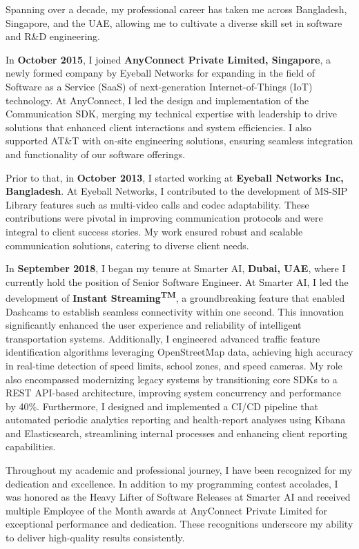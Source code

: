 \documentclass[11pt]{article}
\begin{document}
Spanning over a decade, my professional career has taken me across Bangladesh, Singapore, and the UAE,
allowing me to cultivate a diverse skill set in software and R\&D engineering.

In \textbf{October 2015}, I joined \textbf{AnyConnect Private Limited, Singapore}, a newly formed company by Eyeball
Networks for expanding in the field of Software as a Service (SaaS) of next-generation Internet-of-Things
(IoT) technology. At AnyConnect, I led the design and implementation of the Communication SDK,
merging my technical expertise with leadership to drive solutions that enhanced client interactions and
system efficiencies. I also supported AT\&T with on-site engineering solutions, ensuring seamless integration and
functionality of our software offerings.

Prior to that, in \textbf{October 2013}, I started working at \textbf{Eyeball Networks Inc, Bangladesh}. At
Eyeball Networks, I contributed to the development of MS-SIP Library features such as multi-video calls and
codec adaptability. These contributions were pivotal in improving communication protocols and were integral
to client success stories. My work ensured robust and scalable communication solutions, catering to diverse
client needs.

In \textbf{September 2018}, I began my tenure at Smarter AI, \textbf{Dubai, UAE}, where I currently hold the position
of Senior Software Engineer. At Smarter AI, I led the development of \textbf{Instant Streaming\textsuperscript{TM}},
a groundbreaking feature that enabled Dashcams to establish seamless connectivity within one second. This
innovation significantly enhanced the user experience and reliability of intelligent transportation systems.
Additionally, I engineered advanced traffic feature identification algorithms leveraging OpenStreetMap data,
achieving high accuracy in real-time detection of speed limits, school zones, and speed cameras. My role also
encompassed modernizing legacy systems by transitioning core SDKs to a REST API-based architecture,
improving system concurrency and performance by 40\%. Furthermore, I designed and implemented a CI/CD pipeline
that automated periodic analytics reporting and health-report analyses using Kibana and Elasticsearch,
streamlining internal processes and enhancing client reporting capabilities.

Throughout my academic and professional journey, I have been recognized for my dedication and excellence.
In addition to my programming contest accolades, I was honored as the Heavy Lifter of Software Releases at
Smarter AI and received multiple Employee of the Month awards at AnyConnect Private Limited for exceptional
performance and dedication. These recognitions underscore my ability to deliver high-quality results consistently.
\end{document}
